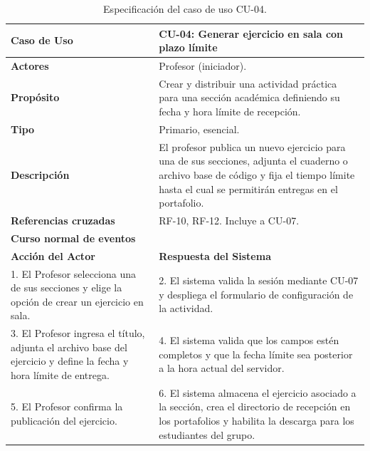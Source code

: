 \begin{table}[H]
\centering
\caption{Especificación del caso de uso CU-04.}
\label{tab:cu_04}
\small
\begin{tabular}{p{} p{}}
\toprule
\textbf{Caso de Uso} & \textbf{CU-04: Generar ejercicio en sala con plazo límite} \\
\midrule
\textbf{Actores} & Profesor (iniciador). \\
\textbf{Propósito} & Crear y distribuir una actividad práctica para una sección académica definiendo su fecha y hora límite de recepción. \\
\textbf{Tipo} & Primario, esencial. \\
\textbf{Descripción} & El profesor publica un nuevo ejercicio para una de sus secciones, adjunta el cuaderno o archivo base de código y fija el tiempo límite hasta el cual se permitirán entregas en el portafolio. \\
\textbf{Referencias cruzadas} & RF-10, RF-12. Incluye a CU-07. \\
\midrule
\multicolumn{2}{l}{\textbf{Curso normal de eventos}} \\
\midrule
\textbf{Acción del Actor} & \textbf{Respuesta del Sistema} \\
\midrule
1. El Profesor selecciona una de sus secciones y elige la opción de crear un ejercicio en sala. & 2. El sistema valida la sesión mediante CU-07 y despliega el formulario de configuración de la actividad. \\
3. El Profesor ingresa el título, adjunta el archivo base del ejercicio y define la fecha y hora límite de entrega. & 4. El sistema valida que los campos estén completos y que la fecha límite sea posterior a la hora actual del servidor. \\
5. El Profesor confirma la publicación del ejercicio. & 6. El sistema almacena el ejercicio asociado a la sección, crea el directorio de recepción en los portafolios y habilita la descarga para los estudiantes del grupo. \\
\bottomrule
\end{tabular}
\end{table}

